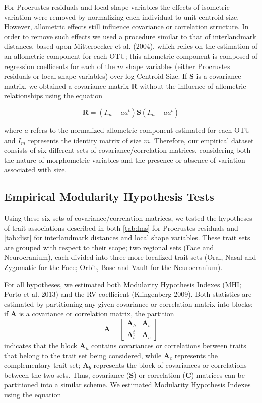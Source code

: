 \documentclass[12pt,]{article}
\begin{document}
For Procrustes residuals and local shape variables the effects of
isometric variation were removed by normalizing each individual to unit
centroid size. However, allometric effects still influence covariance or
correlation structure. In order to remove such effects we used a
procedure similar to that of interlandmark distances, based upon
Mitteroecker et al. (2004), which relies on the estimation of an
allometric component for each OTU; this allometric component is composed
of regression coefficents for each of the $m$ shape variables (either
Procrustes residuals or local shape variables) over log Centroid Size.
If $\mathbf{S}$ is a covariance matrix, we obtained a covariance matrix
$\mathbf{R}$ without the influence of allometric relationships using the
equation

\begin{equation}
\mathbf{R} = (I_m - aa^t) \mathbf{S} (I_m - aa^t)
\label{eq:allo}
\end{equation}

where $a$ refers to the normalized allometric component estimated for
each OTU and $I_m$ represents the identity matrix of size $m$.
Therefore, our empirical dataset consists of six different sets of
covariance/correlation matrices, considering both the nature of
morphometric variables and the presence or absence of variation
associated with size.

\subsection{Empirical Modularity Hypothesis
Tests}\label{empirical-modularity-hypothesis-tests}

Using these six sets of covariance/correlation matrices, we tested the
hypotheses of trait associations described in both \autoref{tab:lms} for
Procrustes residuals and \autoref{tab:dist} for interlandmark distances
and local shape variables. These trait sets are grouped with respect to
their scope; two regional sets (Face and Neurocranium), each divided
into three more localized trait sets (Oral, Nasal and Zygomatic for the
Face; Orbit, Base and Vault for the Neurocranium).

For all hypotheses, we estimated both Modularity Hypothesis Indexes
(MHI; Porto et al. 2013) and the RV coefficient (Klingenberg 2009). Both
statistics are estimated by partitioning any given covariance or
correlation matrix into blocks; if $\mathbf{A}$ is a covariance or
correlation matrix, the partition \[
\mathbf{A} =
\begin{bmatrix}
\mathbf{A}_h & \mathbf{A}_b \\
\mathbf{A}^t_b & \mathbf{A}_c
\end{bmatrix}
\] indicates that the block $\mathbf{A}_h$ contains covariances or
correlations between traits that belong to the trait set being
considered, while $\mathbf{A}_c$ represents the complementary trait set;
$\mathbf{A}_b$ represents the block of covariances or correlations
between the two sets. Thus, covariance ($\mathbf{S}$) or correlation
($\mathbf{C}$) matrices can be partitioned into a similar scheme. We
estimated Modularity Hypothesis Indexes using the equation
\end{document}
